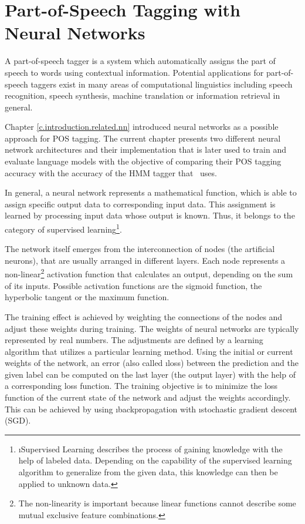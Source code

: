 \chapter{Part-of-Speech Tagging with Neural Networks}\label{c.postagging}
A part-of-speech tagger is a system which automatically assigns the part of speech to words using contextual information. Potential applications for part-of-speech taggers exist in many areas of computational linguistics including speech recognition, speech synthesis, machine translation or information retrieval in general.

Chapter \ref{c.introduction.related.nn} introduced neural networks as a possible approach for POS tagging. The current chapter presents two different neural network architectures and their implementation that is later used to train and evaluate language models with the objective of comparing their POS tagging accuracy with the accuracy of the HMM tagger that \Alex\ uses.

In general, a neural network represents a mathematical function, which is able to assign specific output data to corresponding input data. This assignment is learned by processing input data whose output is known. Thus, it belongs to the category of supervised learning\footnote{\i{Supervised Learning} describes the process of gaining knowledge with the help of labeled data. Depending on the capability of the supervised learning algorithm to generalize from the given data, this knowledge can then be applied to unknown data.}.

The network itself emerges from the interconnection of nodes (the artificial neurons), that are usually arranged in different layers. Each node represents a non-linear\footnote{The non-linearity is important because linear functions cannot describe some mutual exclusive feature combinations.} activation function that calculates an output, depending on the sum of its inputs. Possible activation functions are the sigmoid function, the hyperbolic tangent or the maximum function.

The training effect is achieved by weighting the connections of the nodes and adjust these weights during training. The weights of neural networks are typically represented by real numbers. The adjustments are defined by a learning algorithm that utilizes a particular learning method. Using the initial or current weights of the network, an error (also called \i{loss}) between the prediction and the given label can be computed on the last layer (the output layer) with the help of a corresponding loss function. The training objective is to minimize the loss function of the current state of the network and adjust the weights accordingly. This can be achieved by using \i{backpropagation} with \i{stochastic gradient descent} (SGD).

